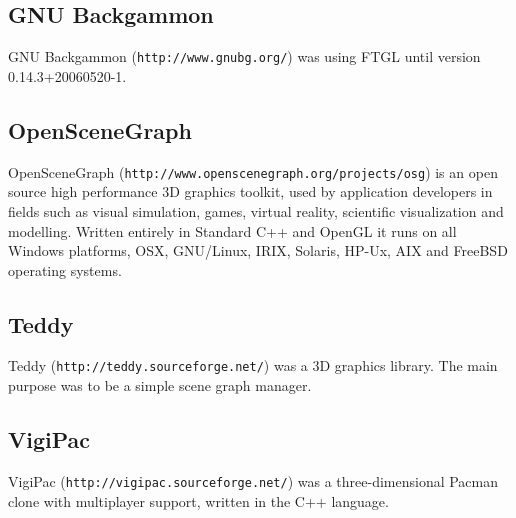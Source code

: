\subsection{GNU Backgammon}\label{ftgl-projects_gnubg}
GNU Backgammon ({\tt http://www.gnubg.org/}) was using FTGL until version 0.14.3+20060520-\/1.\subsection{OpenSceneGraph}\label{ftgl-projects_openscenegraph}
OpenSceneGraph ({\tt http://www.openscenegraph.org/projects/osg}) is an open source high performance 3D graphics toolkit, used by application developers in fields such as visual simulation, games, virtual reality, scientific visualization and modelling. Written entirely in Standard C++ and OpenGL it runs on all Windows platforms, OSX, GNU/Linux, IRIX, Solaris, HP-\/Ux, AIX and FreeBSD operating systems.\subsection{Teddy}\label{ftgl-projects_teddy}
Teddy ({\tt http://teddy.sourceforge.net/}) was a 3D graphics library. The main purpose was to be a simple scene graph manager.\subsection{VigiPac}\label{ftgl-projects_vigipac}
VigiPac ({\tt http://vigipac.sourceforge.net/}) was a three-\/dimensional Pacman clone with multiplayer support, written in the C++ language. 